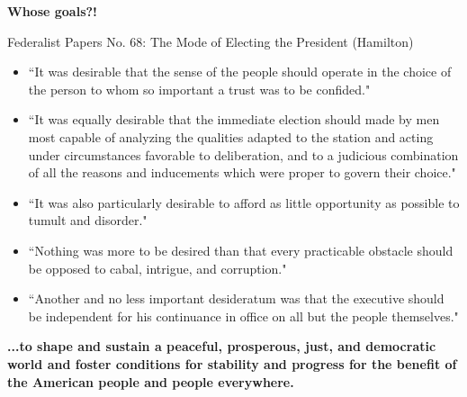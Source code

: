 \documentclass[aspectratio=169]{beamer}
\theoremstyle{principle}
\begin{document}
\begin{frame}

\begin{center}
\huge\textbf{Whose goals?!}
\end{center}

\end{frame}

\begin{frame}

Federalist Papers No. 68: The Mode of Electing the President (Hamilton)
\begin{itemize} 
\item \small ``It was desirable that the sense of the people should operate in the choice of the person to whom so important a trust was to be confided."
\bigskip
\item ``It was equally desirable that the immediate election should made by men most capable of analyzing the qualities adapted to the station and acting under circumstances favorable to deliberation, and to a judicious combination of all the reasons and inducements which were proper to govern their choice."
\bigskip
\item ``It was also particularly desirable to afford as little opportunity as possible to tumult and disorder."
\bigskip
\item ``Nothing was more to be desired than that every practicable obstacle should be opposed to cabal, intrigue, and corruption."
\bigskip
\item ``Another and no less important desideratum was that the executive should be independent for his continuance in office on all but the people themselves."
\end{itemize}

\end{frame}

\begin{frame}

\begin{center}
\huge\textbf{...to shape and sustain a peaceful, prosperous, just, and democratic world and foster conditions for stability and progress for the benefit of the American people and people everywhere.}
\end{center}

\end{frame}
\end{document}
